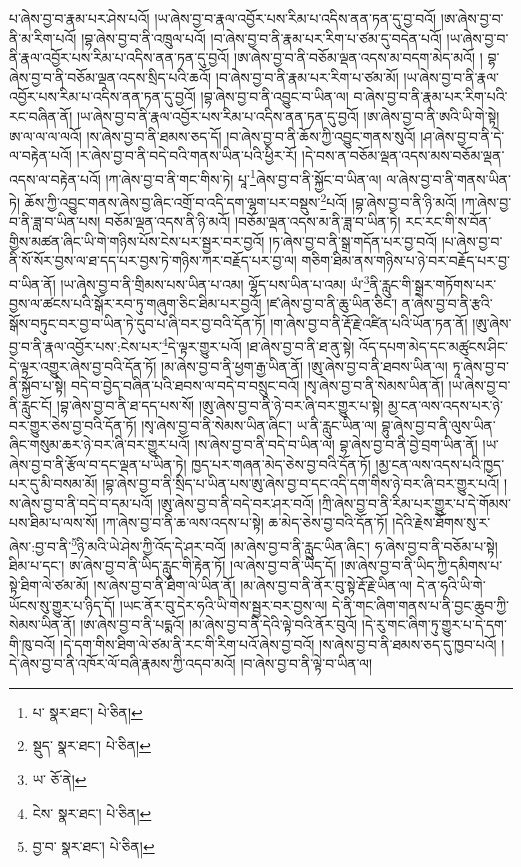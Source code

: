 པ་ཞེས་བྱ་བ་རྣམ་པར་ཤེས་པའོ། །ཡ་ཞེས་བྱ་བ་རྣལ་འབྱོར་པས་རིམ་པ་འདིས་ནན་ཏན་དུ་བྱ་བའོ། །ཨ་ཞེས་བྱ་བ་ནི་མ་རིག་པའོ། །བྷ་ཞེས་བྱ་བ་ནི་འཁྲུལ་པའོ། །བ་ཞེས་བྱ་བ་ནི་རྣམ་པར་རིག་པ་ཙམ་དུ་བདེན་པའོ། །ཡ་ཞེས་བྱ་བ་ནི་རྣལ་འབྱོར་པས་རིམ་པ་འདིས་ནན་ཏན་དུ་བྱའོ། །ཨ་ཞེས་བྱ་བ་ནི་བཅོམ་ལྡན་འདས་མ་བདག་མེད་མའོ། །
བྷ་ཞེས་བྱ་བ་ནི་བཅོམ་ལྡན་འདས་སྲིད་པའི་ཆའོ། །བ་ཞེས་བྱ་བ་ནི་རྣམ་པར་རིག་པ་ཙམ་མོ། །ཡ་ཞེས་བྱ་བ་ནི་རྣལ་འབྱོར་པས་རིམ་པ་འདིས་ནན་ཏན་དུ་བྱའོ། །བྷ་ཞེས་བྱ་བ་ནི་འབྱུང་བ་ཡིན་ལ། བ་ཞེས་བྱ་བ་ནི་རྣམ་པར་རིག་པའི་རང་བཞིན་ནོ། །ཡ་ཞེས་བྱ་བ་ནི་རྣལ་འབྱོར་པས་རིམ་པ་འདིས་ནན་ཏན་དུ་བྱའོ། །ཨ་ཞེས་བྱ་བ་ནི་ཨའི་ཡི་གེ་སྟེ། ཨ་ལ་ལ་ལ་ལའོ། །ས་ཞེས་བྱ་བ་ནི་ཐམས་ཅད་དོ། །བ་ཞེས་བྱ་བ་ནི་ཆོས་ཀྱི་འབྱུང་གནས་སུའོ། །ཤ་ཞེས་བྱ་བ་ནི་དེ་ལ་བརྟེན་པའོ། །ར་ཞེས་བྱ་བ་ནི་བདེ་བའི་གནས་ཡིན་པའི་ཕྱིར་རོ། །དེ་བས་ན་བཅོམ་ལྡན་འདས་མས་བཅོམ་ལྡན་འདས་ལ་བརྟེན་པའོ། །ཀ་ཞེས་བྱ་བ་ནི་གང་གིས་ཏེ། པཱ་\footnote{པ་  སྣར་ཐང་།  པེ་ཅིན། }ཞེས་བྱ་བ་ནི་སྐྱོང་བ་ཡིན་ལ། ལ་ཞེས་བྱ་བ་ནི་གནས་ཡིན་ཏེ། ཆོས་ཀྱི་འབྱུང་གནས་ཞེས་བྱ་ཞིང་འགྲོ་བ་འདི་དག་ལྷག་པར་བསྡུས་\footnote{སྡུད་  སྣར་ཐང་།  པེ་ཅིན། }པའོ། །བྷ་ཞེས་བྱ་བ་ནི་ཉི་མའོ། །ཀ་ཞེས་བྱ་བ་ནི་ཟླ་བ་ཡིན་པས། བཅོམ་ལྡན་འདས་ནི་ཉི་མའོ། །བཅོམ་ལྡན་འདས་མ་ནི་ཟླ་བ་ཡིན་ཏེ། རང་རང་གི་ས་བོན་གྱིས་མཚན་ཞིང་ཡི་གེ་གཉིས་པོས་ངེས་པར་སྦྱར་བར་བྱའོ། །ཏ་ཞེས་བྱ་བ་ནི་སྒྲ་གདོན་པར་བྱ་བའོ། །པ་ཞེས་བྱ་བ་ནི་སོ་སོར་བྱས་ལ་ཐ་དད་པར་བྱས་ཏེ་གཉིས་ཀར་བརྗོད་པར་བྱ་ལ། གཅིག་ཐིམ་ནས་གཉིས་པ་ཉེ་བར་བརྗོད་པར་བྱ་བ་ཡིན་ནོ། །ཡ་ཞེས་བྱ་བ་ནི་གྲིམས་པས་ཡིན་པ་འམ། ལྷོད་པས་ཡིན་པ་འམ། ཡཾ་\footnote{ཡ་  ཅོ་ནེ། }ནི་རླུང་གི་སྒྲར་གཏོགས་པར་བྱས་ལ་ཚངས་པའི་སྒོར་རབ་ཏུ་གཞུག་ཅིང་ཐིམ་པར་བྱའོ། །ཛ་ཞེས་བྱ་བ་ནི་ཆུ་ཡིན་ཅིང་། ན་ཞེས་བྱ་བ་ནི་རྩའི་སྒོས་བཏུང་བར་བྱ་བ་ཡིན་ཏེ་དུབ་པ་ཞི་བར་བྱ་བའི་དོན་ཏོ། །ག་ཞེས་བྱ་བ་ནི་རྡོ་རྗེ་འཛིན་པའི་ཡོན་ཏན་ནོ། །ཨུ་ཞེས་བྱ་བ་ནི་རྣལ་འབྱོར་པས་:ངེས་པར་\footnote{ངེས་  སྣར་ཐང་།  པེ་ཅིན། }དེ་ལྟར་གྱུར་པའོ། །ཐ་ཞེས་བྱ་བ་ནི་ཐ་ནུ་སྟེ། འོད་དཔག་མེད་དང་མཚུངས་ཤིང་དེ་ལྟར་འགྱུར་ཞེས་བྱ་བའི་དོན་ཏོ། །མ་ཞེས་བྱ་བ་ནི་ཕྱག་རྒྱ་ཡིན་ནོ། །ཨུ་ཞེས་བྱ་བ་ནི་ཐབས་ཡིན་ལ། ཏཱ་ཞེས་བྱ་བ་ནི་སྐྱོབ་པ་སྟེ། བདེ་བ་བྱེད་བཞིན་པའི་ཐབས་ལ་བདེ་བ་བསྲུང་བའོ། །སྭ་ཞེས་བྱ་བ་ནི་སེམས་ཡིན་ནོ། །ཡ་ཞེས་བྱ་བ་ནི་རླུང་ངོ། །བྷ་ཞེས་བྱ་བ་ནི་ཐ་དད་པས་སོ། །ཨུ་ཞེས་བྱ་བ་ནི་ཉེ་བར་ཞི་བར་གྱུར་པ་སྟེ། མྱ་ངན་ལས་འདས་པར་ཉེ་བར་གྱུར་ཅེས་བྱ་བའི་དོན་ཏོ། །སྭ་ཞེས་བྱ་བ་ནི་སེམས་ཡིན་ཞིང་། ཡ་ནི་རླུང་ཡིན་ལ། བྷུ་ཞེས་བྱ་བ་ནི་ལུས་ཡིན་ཞིང་གསུམ་ཆར་ཉེ་བར་ཞི་བར་གྱུར་པའོ། །ས་ཞེས་བྱ་བ་ནི་བདེ་བ་ཡིན་ལ། བྷ་ཞེས་བྱ་བ་ནི་བྱེ་བྲག་ཡིན་ནོ། །ཡ་ཞེས་བྱ་བ་ནི་རྩོལ་བ་དང་ལྡན་པ་ཡིན་ཏེ། ཁྱད་པར་གཞན་མེད་ཅེས་བྱ་བའི་དོན་ཏོ། །མྱ་ངན་ལས་འདས་པའི་ཁྱད་པར་དུ་མི་བསམ་མོ། །བྷ་ཞེས་བྱ་བ་ནི་སྲིད་པ་ཡིན་པས་ཨུ་ཞེས་བྱ་བ་དང་འདི་དག་གིས་ཉེ་བར་ཞི་བར་གྱུར་པའོ། །ས་ཞེས་བྱ་བ་ནི་བདེ་བ་དམ་པའོ། །ཨུ་ཞེས་བྱ་བ་ནི་བདེ་བར་ཤར་བའོ། །ཀྲི་ཞེས་བྱ་བ་ནི་རིམ་པར་གྱུར་པ་དེ་གོམས་པས་ཐིམ་པ་ལས་སོ། །ཀ་ཞེས་བྱ་བ་ནི་ཆ་ལས་འདས་པ་སྟེ། ཆ་མེད་ཅེས་བྱ་བའི་དོན་ཏོ། །དེའི་རྗེས་ཐོགས་སུ་ར་ཞེས་:བྱ་བ་ནི་\footnote{བྱ་བ་  སྣར་ཐང་།  པེ་ཅིན། }ཉི་མའི་ཡེ་ཤེས་ཀྱི་འོད་དེ་ཤར་བའོ། །མ་ཞེས་བྱ་བ་ནི་རླུང་ཡིན་ཞིང་། ཧ་ཞེས་བྱ་བ་ནི་བཅོམ་པ་སྟེ། ཐིམ་པ་དང་། ཨ་ཞེས་བྱ་བ་ནི་ཡིད་རླུང་གི་རྟེན་ཏོ། །ལ་ཞེས་བྱ་བ་ནི་ཡིད་དོ། །ཨ་ཞེས་བྱ་བ་ནི་ཡིད་ཀྱི་དམིགས་པ་སྟེ་ཐིག་ལེ་ཙམ་མོ། །ས་ཞེས་བྱ་བ་ནི་ཐིག་ལེ་ཡིན་ནོ། །མ་ཞེས་བྱ་བ་ནི་ནོར་བུ་སྟེ་རྡོ་རྗེ་ཡིན་ལ། དེ་ན་ཧའི་ཡི་གེ་ཡོངས་སུ་གྱུར་པ་ཉིད་དོ། །ཡང་ནོར་བུ་དེར་ཧའི་ཡི་གེས་སྦྱར་བར་བྱས་ལ། དེ་ནི་གང་ཞིག་གནས་པ་ནི་བྱང་ཆུབ་ཀྱི་སེམས་ཡིན་ནོ། །ཨ་ཞེས་བྱ་བ་ནི་པདྨའོ། །མ་ཞེས་བྱ་བ་ནི་དེའི་ལྟེ་བའི་ནོར་བུའོ། །དེ་རུ་གང་ཞིག་ཏུ་གྱུར་པ་དེ་དག་གི་ཁུ་བའོ། །དེ་དག་གིས་ཐིག་ལེ་ཙམ་ནི་རང་གི་རིག་པའོ་ཞེས་བྱ་བའོ། །ས་ཞེས་བྱ་བ་ནི་ཐམས་ཅད་དུ་ཁྱབ་པའོ། །དེ་ཞེས་བྱ་བ་ནི་འཁོར་ལོ་བཞི་རྣམས་ཀྱི་འདབ་མའོ། །བ་ཞེས་བྱ་བ་ནི་ལྟེ་བ་ཡིན་ལ། 
